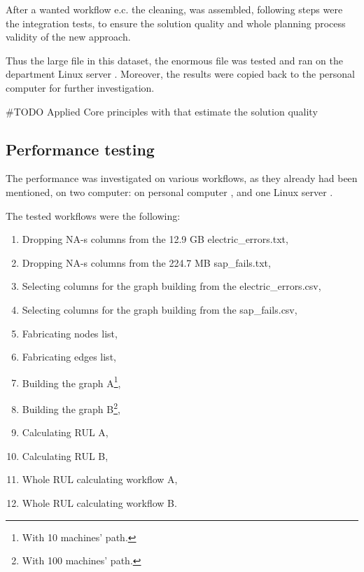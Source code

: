 After a wanted workflow e.c. the cleaning, was assembled, following steps were the integration tests, to ensure the solution quality and whole planning process validity of the new approach.

Thus the large file in this dataset, the enormous file was tested and ran on the department Linux server \cite{Batman}.
Moreover, the results were copied back to the personal computer for further investigation.

\#TODO Applied Core principles with that estimate the solution quality
\subsection{Performance testing}
The performance was investigated on various workflows, as they already had been mentioned, on two computer: on personal computer \cite{Latitude}, and one Linux server \cite{Batman}.

The tested workflows were the following:
\begin{enumerate}
	\item{Dropping NA-s columns from the 12.9 GB electric\_errors.txt,}
	\item{Dropping NA-s columns from the 224.7 MB sap\_fails.txt,}
	\item{Selecting columns for the graph building from the electric\_errors.csv,}
	\item{Selecting columns for the graph building from the sap\_fails.csv,}
	\item{Fabricating nodes list,}
	\item{Fabricating edges list,}
	\item{Building the graph A\footnote{With 10 machines' path.},}
	\item{Building the graph B\footnote{With 100 machines' path.},}
	\item{Calculating RUL A,}
	\item{Calculating RUL B,}
	\item{Whole RUL calculating workflow A,}
	\item{Whole RUL calculating workflow B.}
\end{enumerate} 

